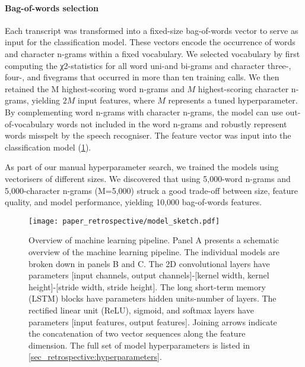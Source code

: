 {\begin{table}[t]
{\begin{tabular}{l|l|l}
        \bottomrule
    \end{tabular}%
    \vspace{-2mm}
    }
\end{table}


\paragraph{Bag-of-words selection}

Each transcript was transformed into a fixed-size bag-of-words vector to serve as input for the classification model. These vectors encode the occurrence of words and character n-grams within a fixed vocabulary. We selected vocabulary by first computing the χ2-statistics for all word uni-and bi-grams and character three-, four-, and fivegrams that occurred in more than ten training calls. We then retained the M highest-scoring word n-grams and $M$ highest-scoring character n-grams, yielding $2M$ input features, where $M$ represents a tuned hyperparameter. By complementing word n-grams with character n-grams, the model can use out-of-vocabulary words not included in the word n-grams and robustly represent words misspelt by the speech recogniser. The feature vector was input into the classification model (\cref{fig_retrospective:model_sketch}).

As part of our manual hyperparameter search, we trained the models using vectorisers of different sizes. We discovered that using 5,000-word n-grams and 5,000-character n-grams (M=5,000) struck a good trade-off between size, feature quality, and model performance, yielding 10,000 bag-of-words features.

\begin{figure}[t]
    \centering
    \texttt{[image: paper\_retrospective/model\_sketch.pdf]}
    \caption[Overview of machine learning pipeline for stroke recognition.]{Overview of machine learning pipeline. Panel A presents a schematic overview of the machine learning pipeline. The individual models are broken down in panels B and C. The 2D convolutional layers have parameters [input channels, output channels]-[kernel width, kernel height]-[stride width, stride height]. The long short-term memory (LSTM) blocks have parameters hidden units-number of layers. The rectified linear unit (ReLU), sigmoid, and softmax layers have parameters [input features, output features]. Joining arrows indicate the concatenation of two vector sequences along the feature dimension. The full set of model hyperparameters is listed in \cref{sec_retrospective:hyperparameters}.}
    \label{fig_retrospective:model_sketch}
\end{figure}

}
